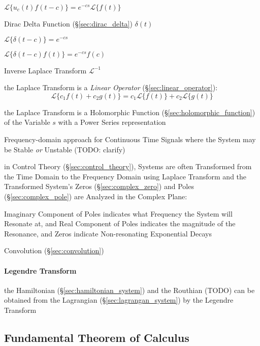$\mathcal{L}\{ u_c(t)f(t-c) \} = e^{-cs}\mathcal{L}\{f(t)\}$

Dirac Delta Function (\S\ref{sec:dirac_delta}) $\delta(t)$

$\mathcal{L}\{ \delta(t-c) \} = e^{-cs}$

$\mathcal{L}\{ \delta(t-c)f(t) \} = e^{-cs}f(c) $

Inverse Laplace Transform $\mathcal{L}^{-1}$

the Laplace Transform is a \emph{Linear Operator}
(\S\ref{sec:linear_operator}):
\[
  \mathcal{L} \{ c_1 f(t) + c_2 g(t) \}
    = c_1\mathcal{L}\{f(t)\} + c_2\mathcal{L}\{g(t)\}
\]

the Laplace Transform is a Holomorphic Function
(\S\ref{sec:holomorphic_function}) of the Variable $s$ with a Power Series
representation

Frequency-domain approach for Continuous Time Signals where the System may be
Stable \emph{or} Unstable (TODO: clarify)

in Control Theory (\S\ref{sec:control_theory}), Systems are often Transformed
from the Time Domain to the Frequency Domain using Laplace Transform and the
Transformed System's Zeros (\S\ref{sec:complex_zero}) and Poles
(\S\ref{sec:complex_pole}) are Analyzed in the Complex Plane:

Imaginary Component of Poles indicates what Frequency the System will Resonate
at, and Real Component of Poles indicates the magnitude of the Resonance, and
Zeros indicate Non-resonating Exponential Decays

Convolution (\S\ref{sec:convolution})



\paragraph{Legendre Transform}\label{sec:legendre_transform}\hfill

the Hamiltonian (\S\ref{sec:hamiltonian_system}) and the Routhian (TODO) can be
obtained from the Lagrangian (\S\ref{sec:lagrangan_system}) by the Legendre
Transform



\subsection{Fundamental Theorem of Calculus}
\label{sec:fundamental_calculus_theorem}

